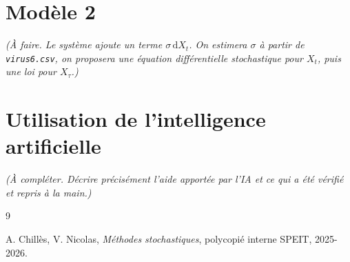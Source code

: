 \documentclass[12pt,a4paper]{article}
\begin{document}
\section{Modèle 2}

\textit{(À faire. Le système ajoute un terme $\sigma\,\mathrm{d}X_t$. On estimera $\sigma$ à partir de
\texttt{virus6.csv}, on proposera une équation différentielle stochastique pour $X_t$, puis une loi pour
$X_\tau$.)}

\section{Utilisation de l'intelligence artificielle}

\textit{(À compléter. Décrire précisément l'aide apportée par l'IA et ce qui a été vérifié et repris à la
main.)}

\begin{thebibliography}{9}

A. Chillès, V. Nicolas,
\textit{Méthodes stochastiques}, polycopié interne SPEIT, 2025-2026.

\end{thebibliography}
\end{document}
